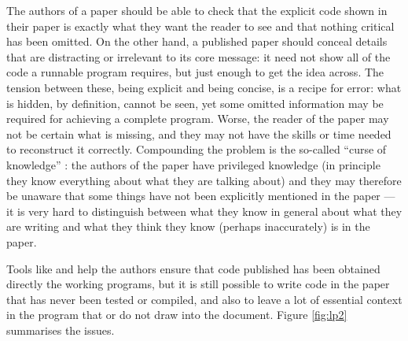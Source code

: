 \documentclass[prodmode,acmtecs]{acmsmall} %
\begin{document}
The authors of a paper should be able to check that the explicit code shown in their paper is exactly what they want the reader to see and that nothing critical has been omitted. On the other hand, a published paper should conceal details that are distracting or irrelevant to its core message: it need not show all of the code a runnable program requires, but just enough to get the idea across. The tension between these, being explicit and being concise, is a recipe for error: what is hidden, by definition, cannot be seen, yet some omitted information may be required for achieving a complete program. Worse, the reader of the paper may not be certain what is missing, and they may not have the skills or time needed to reconstruct it correctly. Compounding the problem is the so-called ``curse of knowledge'' \cite{pinker}: the authors of the paper have privileged knowledge (in principle they know everything about what they are talking about) and they may therefore be unaware that some things have not been explicitly mentioned in the paper --- it is very hard to distinguish between what they know in general about what they are writing and what they think they know (perhaps inaccurately) is in the paper.

Tools like  and  help the authors ensure that code published has been obtained directly the working programs, but it is still possible to write code in the paper that has never been tested or compiled, and also to leave a lot of essential context in the program that  or  do not draw into the document. Figure \ref{fig:lp2} summarises the issues. 
\end{document}
